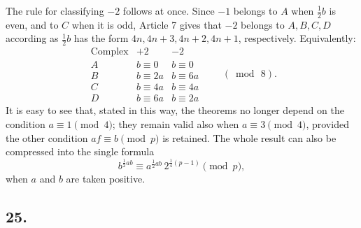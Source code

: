 \documentclass[12pt]{article}
\begin{document}
The rule for classifying $-2$ follows at once. Since $-1$ belongs to $A$ when $\frac12 b$ is even, and to $C$ when it is odd, Article 7 gives that $-2$ belongs to $A,B,C,D$ according as $\frac12 b$ has the form $4n,4n+3,4n+2,4n+1$, respectively. Equivalently:
\[
\begin{array}{c|cc}
\text{Complex} & +2 & -2\\
\hline
A & b\equiv 0 & b\equiv 0\\
B & b\equiv 2a & b\equiv 6a\\
C & b\equiv 4a & b\equiv 4a\\
D & b\equiv 6a & b\equiv 2a
\end{array}
\qquad(\bmod\,8).
\]
It is easy to see that, stated in this way, the theorems no longer depend on the condition $a\equiv1\pmod4$; they remain valid also when $a\equiv3\pmod4$, provided the other condition $af\equiv b\pmod p$ is retained. The whole result can also be compressed into the single formula
\[
b^{\frac12ab}\equiv a^{\frac12ab}\,2^{\frac14(p-1)}\pmod p,
\]
when $a$ and $b$ are taken positive.

\subsection*{25.}
\end{document}
